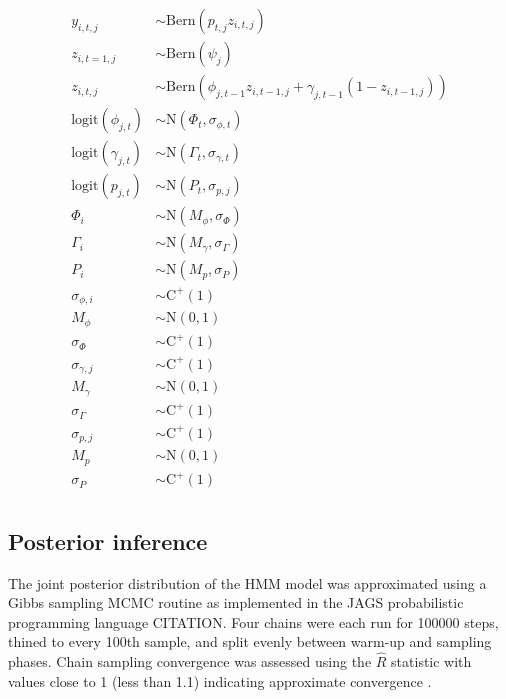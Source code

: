 \documentclass[12pt,letterpaper]{article}
\begin{document}
\begin{equation}
  \begin{aligned}
    y_{i, t, j} &\sim \mathrm{Bern}(p_{t, j} z_{i, t, j}) \\
    z_{i, t = 1, j} &\sim \mathrm{Bern}(\psi_{j}) \\
    z_{i, t, j} &\sim \mathrm{Bern}(\phi_{j, t - 1} z_{i, t - 1, j} + \gamma_{j, t - 1} (1 - z_{i, t - 1, j})) \\
    \mathrm{logit}(\phi_{j, t}) &\sim \mathrm{N}(\Phi_{t}, \sigma_{\phi, t}) \\
    \mathrm{logit}(\gamma_{j, t}) &\sim \mathrm{N}(\Gamma_{t}, \sigma_{\gamma, t}) \\
    \mathrm{logit}(p_{j, t}) &\sim \mathrm{N}(P_{t}, \sigma_{p, j}) \\
    \Phi_{i} &\sim \mathrm{N}(M_{\phi}, \sigma_{\Phi}) \\
    \Gamma_{i} &\sim \mathrm{N}(M_{\gamma}, \sigma_{\Gamma}) \\
    P_{i} &\sim \mathrm{N}(M_{p}, \sigma_{P}) \\
    \sigma_{\phi, i} &\sim \mathrm{C}^{+}(1) \\
    M_{\phi} &\sim \mathrm{N}(0, 1) \\
    \sigma_{\Phi} &\sim \mathrm{C}^{+}(1) \\
    \sigma_{\gamma, j} &\sim \mathrm{C}^{+}(1) \\
    M_{\gamma} &\sim \mathrm{N}(0, 1) \\
    \sigma_{\Gamma} &\sim \mathrm{C}^{+}(1) \\
    \sigma_{p, j} &\sim \mathrm{C}^{+}(1) \\
    M_{p} &\sim \mathrm{N}(0, 1) \\
    \sigma_{P} &\sim \mathrm{C}^{+}(1) \\
  \end{aligned}
\end{equation}


\subsection{Posterior inference}
The joint posterior distribution of the HMM model was approximated using a Gibbs sampling MCMC routine as implemented in the JAGS probabilistic programming language CITATION. Four chains were each run for 100000 steps, thined to every 100th sample, and split evenly between warm-up and sampling phases. Chain sampling convergence was assessed using the \(\hat{R}\) statistic with values close to 1 (less than 1.1) indicating approximate convergence \citep{Gelman2013d}.
\end{document}
